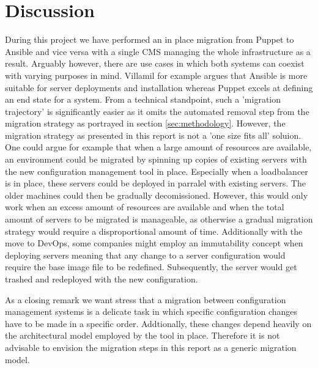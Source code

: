 \section{Discussion}\label{sec:discussion}
During this project we have performed an in place migration from Puppet to Ansible and vice versa with a single CMS managing the whole infrastructure as a result. Arguably however, there are use cases in which both systems can coexist with varying purposes in mind. Villamil \cite{villamil_2014} for example argues that Ansible is more suitable for server deployments and installation whereas Puppet excels at defining an end state for a system. From a technical standpoint, such a 'migration trajectory' is significantly easier as it omits the automated removal step from the migration strategy as portrayed in section \ref{sec:methodology}. However, the migration strategy as presented in this report is not a 'one size fits all' soluion. One could argue for example that when a large amount of resources are available, an environment could be migrated by spinning up copies of existing servers with the new configuration management tool in place. Especially when a loadbalancer is in place, these servers could be deployed in parralel with existing servers. The older machines could then be gradually decomissioned. However, this would only work when an excess amount of resources are available and when the total amount of servers to be migrated is manageable, as otherwise a gradual migration strategy would require a disproportional amount of time. Additionally with the move to DevOps, some companies might employ an immutability concept when deploying servers meaning that any change to a server configuration would require the base image file to be redefined. Subsequently, the server would get trashed and redeployed with the new configuration. 

As a closing remark we want stress that a migration between configuration management systems is a delicate task in which specific configuration changes have to be made in a specific order. Addtionally, these changes depend heavily on the architectural model employed by the tool in place. Therefore it is not advisable to envision the migration steps in this report as a generic migration model.

